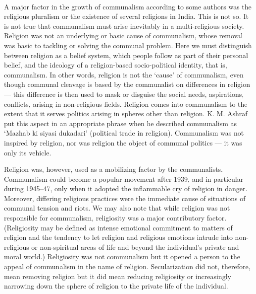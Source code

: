\begin{multicols}{2}
\paragraph*{}
A major factor in the growth of communalism according to some authors was the religious pluralism or the existence of several religions in India. This is not so. It is not true that communalism must arise inevitably in a multi-religious society. Religion was not an underlying or basic cause of communalism, whose removal was basic to tackling or solving the communal problem. Here we must distinguish between religion as a belief system, which people follow as part of their personal belief, and the ideology of a religion-based socio-political identity, that is, communalism. In other words, religion is not the `cause' of communalism, even though communal cleavage is based by the communalist on differences in religion --- this difference is then used to mask or disguise the social needs, aspirations, conflicts, arising in non-religious fields. Religion comes into communalism to the extent that it serves politics arising in spheres other than religion. K. M. Ashraf put this aspect in an appropriate phrase when he described communalism as `Mazhab ki siyasi dukadari' (political trade in religion). Communalism was not inspired by religion, nor was religion the object of communal politics --- it was only its vehicle.

Religion was, however, used as a mobilizing factor by the communalists. Communalism could become a popular movement after 1939, and in particular during 1945--47, only when it adopted the inflammable cry of religion in danger. Moreover, differing religious practices were the immediate cause of situations of communal tension and riots. We may also note that while religion was not responsible for communalism, religiosity was a major contributory factor. (Religiosity may be defined as intense emotional commitment to matters of religion and the tendency to let religion and religious emotions intrude into non-religious or non-spiritual areas of life and beyond the individual's private and moral world.) Religiosity was not communalism but it opened a person to the appeal of communalism in the name of religion. Secularization did not, therefore, mean removing religion but it did mean reducing religiosity or increasingly narrowing down the sphere of religion to the private life of the individual.

\end{multicols}
